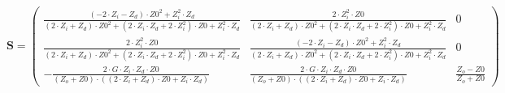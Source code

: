 \begin{equation} \mathbf{S} = \left(\begin{array}{ccc}
\frac{\left(-2\cdot Z_i - Z_d \right)\cdot Z0^2+ Z_i ^2\cdot Z_d
}{\left(2\cdot Z_i + Z_d \right)\cdot Z0^2+\left(2\cdot Z_i \cdot Z_d
+2\cdot Z_i ^2\right)\cdot Z0+ Z_i ^2\cdot Z_d } & \frac{2\cdot Z_i
^2\cdot Z0}{\left(2\cdot Z_i + Z_d \right)\cdot Z0^2+\left(2\cdot Z_i
\cdot Z_d +2\cdot Z_i ^2\right)\cdot Z0+ Z_i ^2\cdot Z_d } & 0 \\
\frac{2\cdot Z_i ^2\cdot Z0}{\left(2\cdot Z_i + Z_d \right)\cdot
Z0^2+\left(2\cdot Z_i \cdot Z_d +2\cdot Z_i ^2\right)\cdot Z0+ Z_i
^2\cdot Z_d } & \frac{\left(-2\cdot Z_i - Z_d \right)\cdot Z0^2+ Z_i
^2\cdot Z_d }{\left(2\cdot Z_i + Z_d \right)\cdot Z0^2+\left(2\cdot
Z_i \cdot Z_d +2\cdot Z_i ^2\right)\cdot Z0+ Z_i ^2\cdot Z_d } & 0 \\
-\frac{2\cdot G \cdot Z_i \cdot Z_d \cdot Z0}{\left( Z_o
+Z0\right)\cdot \left(\left(2\cdot Z_i + Z_d \right)\cdot Z0+ Z_i
\cdot Z_d \right)} & \frac{2\cdot G \cdot Z_i \cdot Z_d \cdot
Z0}{\left( Z_o +Z0\right)\cdot \left(\left(2\cdot Z_i + Z_d
\right)\cdot Z0+ Z_i \cdot Z_d \right)} & \frac{ Z_o -Z0}{ Z_o +Z0}
\end{array}\right) \end{equation}
